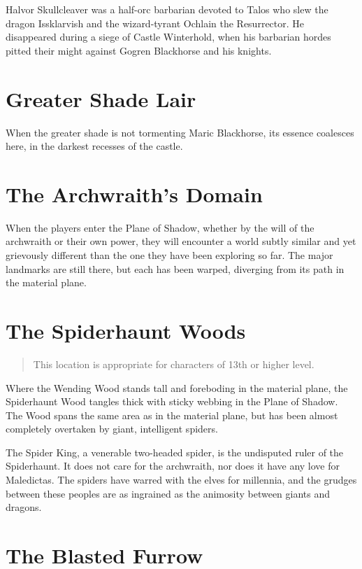 Halvor Skullcleaver was a half-orc barbarian devoted to Talos who slew the dragon
Issklarvish and the wizard-tyrant Ochlain the Resurrector. He disappeared during
a siege of Castle Winterhold, when his barbarian hordes pitted their might against
Gogren Blackhorse and his knights.

\section{Greater Shade Lair}

When the greater shade is not tormenting Maric Blackhorse, its essence coalesces
here, in the darkest recesses of the castle.

\section{The Archwraith's Domain}

When the players enter the Plane of Shadow, whether by the will of the archwraith
or their own power, they will encounter a world subtly similar and yet grievously
different than the one they have been exploring so far. The major landmarks are still
there, but each has been warped, diverging from its path in the material plane.

\section{The Spiderhaunt Woods} \label{loc:spiderhaunt}

\begin{quote}
  This location is appropriate for characters of 13th or higher level.
\end{quote}

Where the Wending Wood stands tall and foreboding in the material plane, the Spiderhaunt
Wood tangles thick with sticky webbing in the Plane of Shadow. The Wood spans the same
area as in the material plane, but has been almost completely overtaken by giant,
intelligent spiders.

The Spider King, a venerable two-headed spider, is the undisputed ruler of the Spiderhaunt.
It does not care for the archwraith, nor does it have any love for Maledictas.
The spiders have warred with the elves for millennia, and the grudges between these
peoples are as ingrained as the animosity between giants and dragons.

\section{The Blasted Furrow} \label{loc:blastedfurrow}

